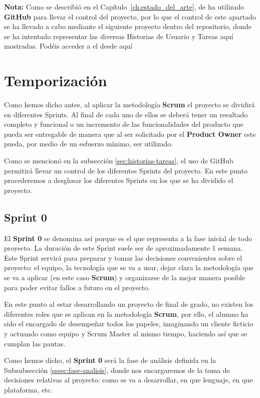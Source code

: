 \textbf{Nota:} Como se describió en el Capítulo~\ref{ch:estado_del_arte}, de ha utilizado \textbf{GitHub} para llevar el control del proyecto, por lo que el control de este apartado se ha llevado a cabo mediante el siguiente proyecto dentro del repositorio, donde se ha intentado representar las diversas Historias de Usuario y Tareas aquí mostradas. Podéis acceder a el desde aquí \cite{proyecto-github}

\section{Temporización}

Como hemos dicho antes, al aplicar la metodología \textbf{Scrum} el proyecto se dividirá en diferentes Sprints. Al final de cada uno de ellos se deberá tener un resultado completo y funcional o un incremento de las funcionalidades del producto que pueda ser entregable de manera que al ser solicitado por el \textbf{Product Owner} este pueda, por medio de un esfuerzo mínimo, ser utilizado.

Como se mencionó en la subsección \ref{sec:historias-tareas}, el uso de GitHub permitirá llevar un control de los diferentes Sprints del proyecto. En este punto procederemos a desglosar los diferentes Sprints en los que se ha dividido el proyecto.

\subsection{Sprint 0}

El \textbf{Sprint 0} se denomina así porque es el que representa a la fase inicial de todo proyecto. La duración de este Sprint suele ser de aproximadamente 1 semana. Este Sprint servirá para preparar y tomar las decisiones convenientes sobre el proyecto: el equipo, la tecnología que se va a usar, dejar clara la metodología que se va a aplicar (en este caso \textbf{Scrum}) y organizarse de la mejor manera posible para poder evitar fallos a futuro en el proyecto.

En este punto al estar desarrollando un proyecto de final de grado, no existen los diferentes roles que se aplican en la metodología \textbf{Scrum}, por ello, el alumno ha sido el encargado de desempeñar todos los papeles, imaginando un cliente ficticio y actuando como equipo y Scrum Master al mismo tiempo, haciendo así que se cumplan las pautas.

Como hemos dicho, el \textbf{Sprint 0} será la fase de análisis definida en la Subsubsección \ref{sssec:fase-analisis}, donde nos encargaremos de la toma de decisiones relativas al proyecto: como se va a desarrollar, en que lenguaje, en que plataforma, etc.

